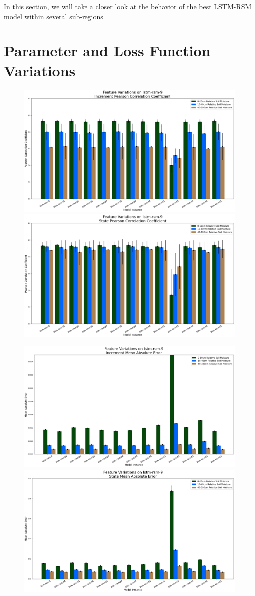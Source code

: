 In this section, we will take a closer look at the behavior of the best LSTM-RSM model within several sub-regions

\newpage

\section{Parameter and Loss Function Variations}

\begin{figure}[hp!]
    \centering
    \includegraphics[width=.48\linewidth,draft=false]{figures/efficiency_variations/eval_test_efficiency_variations-feat-lstm-rsm-9_cc_res.png}
    \includegraphics[width=.48\linewidth,draft=false]{figures/efficiency_variations/eval_test_efficiency_variations-feat-lstm-rsm-9_cc_state.png}

    \includegraphics[width=.48\linewidth,draft=false]{figures/efficiency_variations/eval_test_efficiency_variations-feat-lstm-rsm-9_mae_res.png}
    \includegraphics[width=.48\linewidth,draft=false]{figures/efficiency_variations/eval_test_efficiency_variations-feat-lstm-rsm-9_mae_state.png}


\end{figure}
